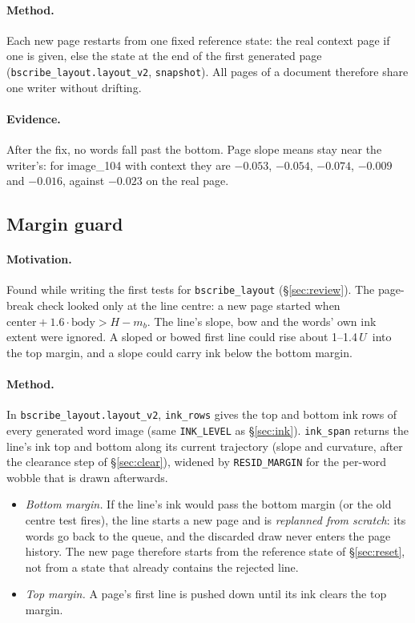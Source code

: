 \documentclass[11pt,a4paper]{article}
\newcommand{\U}{\ensuremath{U}}
\begin{document}
\paragraph{Method.} Each new page restarts from one fixed reference state:
the real context page if one is given, else the state at the end of the
first generated page (\texttt{bscribe\_layout.layout\_v2}, \texttt{snapshot}).
All pages of a document therefore share one writer without drifting.

\paragraph{Evidence.} After the fix, no words fall past the bottom. Page slope
means stay near the writer's: for image\_104 with context they are $-0.053$,
$-0.054$, $-0.074$, $-0.009$ and $-0.016$, against $-0.023$ on the real page.

\subsection{Margin guard}
\label{sec:margin}
\paragraph{Motivation.} Found while writing the first tests for
\texttt{bscribe\_layout} (\S\ref{sec:review}). The page-break check looked
only at the line centre: a new page started when
$\text{center}+1.6\cdot\text{body}>H-m_b$. The line's slope, bow and the
words' own ink extent were ignored. A sloped or bowed first line could rise
about 1--1.4\,\U\ into the top margin, and a slope could carry ink below the
bottom margin.

\paragraph{Method.} In \texttt{bscribe\_layout.layout\_v2},
\texttt{ink\_rows} gives the top and bottom ink rows of every generated word
image (same \texttt{INK\_LEVEL} as \S\ref{sec:ink}). \texttt{ink\_span}
returns the line's ink top and bottom along its current trajectory (slope and
curvature, after the clearance step of \S\ref{sec:clear}), widened by
\texttt{RESID\_MARGIN} for the per-word wobble that is drawn afterwards.
\begin{itemize}
\item \emph{Bottom margin.} If the line's ink would pass the bottom margin
  (or the old centre test fires), the line starts a new page and is
  \emph{replanned from scratch}: its words go back to the queue, and the
  discarded draw never enters the page history. The new page therefore starts
  from the reference state of \S\ref{sec:reset}, not from a state that already
  contains the rejected line.
\item \emph{Top margin.} A page's first line is pushed down until its ink
  clears the top margin.
\end{itemize}
\end{document}
